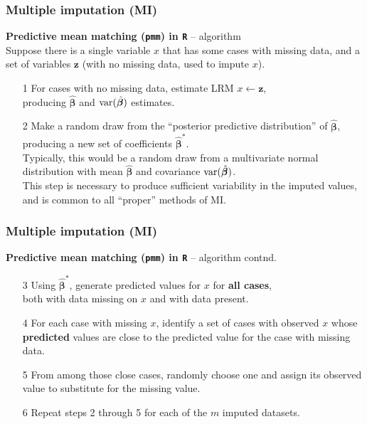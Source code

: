\documentclass{beamer}
\begin{document}
\begin{frame}
\frametitle{Multiple imputation (MI)}
\textbf{Predictive mean matching (\texttt{pmm}) in \texttt{R}} -- algorithm\\
\medskip
Suppose there is a single variable $x$ that has some cases with missing data, and a set of variables $\bm{z}$ (with no missing data, used to impute $x$).
\bigskip
\begin{enumerate}
    \item[1] For cases with no missing data, estimate LRM $x \leftarrow \bm{z}$, \\producing $\hat{\bm{\beta}}$ and $\textnormal{var}(\hat{\bm{\beta}})$ estimates.
    \smallskip
    \item[2] Make a random draw from the ``posterior predictive distribution'' of $\hat{\bm{\beta}}$, producing a new set of coefficients $\hat{\bm{\beta}}^{\ast}$.\\
    \smallskip
    Typically, this would be a random draw from a multivariate normal distribution with mean $\hat{\bm{\beta}}$ and covariance $\textnormal{var}(\hat{\bm{\beta}})$. \\
    \smallskip 
    This step is necessary to produce sufficient variability in the imputed values, and is common to all ``proper'' methods of MI.
\end{enumerate}
\end{frame}
\begin{frame}
\frametitle{Multiple imputation (MI)}
\textbf{Predictive mean matching (\texttt{pmm}) in \texttt{R}} -- algorithm contnd.\\
\bigskip
\begin{enumerate}
    \item[3] Using $\hat{\bm{\beta}}^{\ast}$, generate predicted values for $x$ for \textbf{all cases}, \\both with data missing on $x$ and with data present.
    \smallskip
    \item[4] For each case with missing $x$, identify a set of cases with observed $x$ whose \textbf{predicted} values are close to the predicted value for the case with missing data.
    \smallskip
    \item[5] From among those close cases, randomly choose one and assign its observed value to substitute for the missing value.
    \smallskip
    \item[6] Repeat steps 2 through 5 for each of the $m$ imputed datasets.  
\end{enumerate}
\end{frame}
\end{document}
